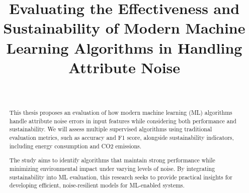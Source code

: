 \documentclass[conference]{IEEEtran}
\begin{document}
\title{Evaluating the Effectiveness and Sustainability of Modern Machine Learning Algorithms in Handling Attribute Noise}

\author{
 \\
}

\maketitle

\begin{abstract}
This thesis proposes an evaluation of how modern machine learning (ML) algorithms handle attribute noise errors in input features while considering both performance and sustainability. We will assess multiple supervised algorithms using traditional evaluation metrics, such as accuracy and F1 score, alongside sustainability indicators, including energy consumption and CO2 emissions.
    
The study aims to identify algorithms that maintain strong performance while minimizing environmental impact under varying levels of noise. By integrating sustainability into ML evaluation, this research seeks to provide practical insights for developing efficient, noise-resilient models for ML-enabled systems.
\end{abstract}


\end{document}
